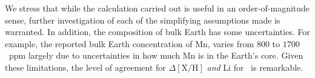 \documentclass[12pt,letterpaper,margin=1in]{article}
\newcommand*\elem[1]{\ensuremath{\mathrm{#1}}}
\newcommand*\elemH[1]{\ensuremath{[\mathrm{#1}/\elem{H}]}}
\newcommand{\bizarreone}{\text{Kronos}}
\begin{document}
We stress that while the calculation carried out is useful in
an order-of-magnitude sense, further investigation of each of the simplifying
assumptions made is warranted.
In addition, the composition of bulk Earth has some uncertainties.
For example, the reported bulk Earth concentration of \elem{Mn}, varies from
$800$ to $1700$~ppm\cite{1998psc..book.....L,mcdonough2001composition,2003TrGeo...2..547M}
largely due to uncertainties in how much \elem{Mn} is in the Earth's core.
Given these limitations, the level of agreement for $\Delta\elemH{X}$ {\it and}
\elem{Li} for \bizarreone\ is remarkable.

%
\end{document}

